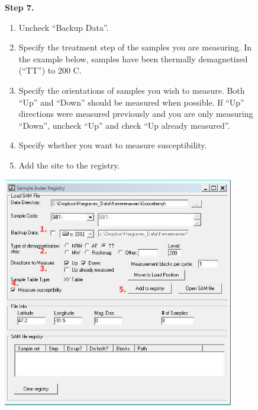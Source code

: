 \documentclass[11pt,letterpaper]{article}
\begin{document}
\begin{figure}
\begin{flushleft}
\textbf{Step 7.}
\begin{enumerate}
\item{Uncheck ``Backup Data''.} 
\item{Specify the treatment step of the samples you are measuring. In the example below, samples have been thermally demagnetized (``TT'') to 200 \textdegree C.}
\item{Specify the orientations of samples you wish to measure. Both ``Up'' and ``Down'' should be measured when possible. If ``Up'' directions were measured previously and you are only measuring ``Down'', uncheck ``Up'' and check ``Up already measured''.}
\item{Specify whether you want to measure susceptibility}.
\item{Add the site to the registry.}
\end{enumerate}
\end{flushleft}
\centering
\includegraphics[width=0.9\textwidth]{images/Capture7.jpg}
\end{figure}
\end{document}
